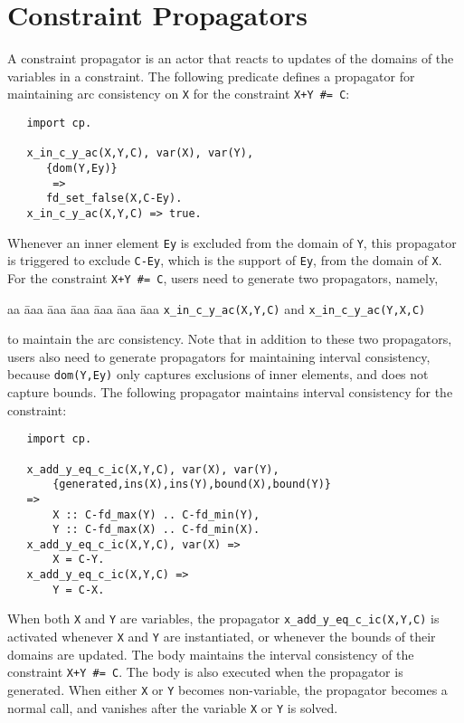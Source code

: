 \section{Constraint Propagators}
A constraint propagator is an actor that reacts to updates of the domains of the variables in a constraint. The following predicate defines a propagator for maintaining arc consistency on \texttt{X} for the constraint \verb-X+Y #= C-:
\begin{verbatim}
   import cp.

   x_in_c_y_ac(X,Y,C), var(X), var(Y),
      {dom(Y,Ey)}
       =>         
      fd_set_false(X,C-Ey).
   x_in_c_y_ac(X,Y,C) => true.
\end{verbatim}
Whenever an inner element \texttt{Ey} is excluded from the domain of \texttt{Y}, this propagator is triggered to exclude \texttt{C-Ey}, which is the support of \texttt{Ey}, from the domain of \texttt{X}. For the constraint \verb-X+Y #= C-, users need to generate two propagators, namely,
\begin{tabbing}
aa \= aaa \= aaa \= aaa \= aaa \= aaa \= aaa \kill
\> \texttt{x\_in\_c\_y\_ac(X,Y,C)} and \texttt{x\_in\_c\_y\_ac(Y,X,C)}
\end{tabbing}
to maintain the arc consistency. Note that in addition to these two propagators, users also need to generate propagators for maintaining interval consistency, because \texttt{dom(Y,Ey)} only captures exclusions of inner elements, and does not capture bounds. The following propagator maintains interval consistency for the constraint:
\begin{verbatim}
   import cp.

   x_add_y_eq_c_ic(X,Y,C), var(X), var(Y),
       {generated,ins(X),ins(Y),bound(X),bound(Y)}
   =>         
       X :: C-fd_max(Y) .. C-fd_min(Y),
       Y :: C-fd_max(X) .. C-fd_min(X).
   x_add_y_eq_c_ic(X,Y,C), var(X) =>
       X = C-Y.
   x_add_y_eq_c_ic(X,Y,C) =>
       Y = C-X.
\end{verbatim}
When both \texttt{X} and \texttt{Y} are variables, the propagator \texttt{x\_add\_y\_eq\_c\_ic(X,Y,C)} is activated whenever \texttt{X} and \texttt{Y} are instantiated, or whenever the bounds of their domains are updated. The body maintains the interval consistency of the constraint \verb-X+Y #= C-. The body is also executed when the propagator is generated. When either \texttt{X} or \texttt{Y} becomes non-variable, the propagator becomes a normal call, and vanishes after the variable \texttt{X} or \texttt{Y} is solved.

